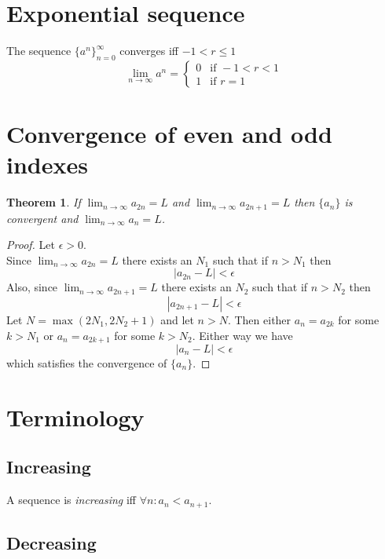 \documentclass{article}
\begin{document}
\section{Exponential sequence} %

The sequence \({\{a^n\}}_{n=0}^\infty\) converges iff \(-1<r\leq 1\)
\[
    \lim_{n\to\infty} a^n = \begin{cases}
        0 & \text{if } -1 < r < 1 \\
        1 & \text{if } r=1
    \end{cases}
\]

\pagebreak

\section{Convergence of even and odd indexes}

\newtheorem*{theorem1}{Theorem}

\begin{theorem1}
    If \(\lim_{n\to\infty}a_{2n}=L\) and \(\lim_{n\to\infty}a_{2n+1}=L\)
    then \(\{a_n\}\) is convergent and \(\lim_{n\to\infty}a_n=L\).
\end{theorem1}
\begin{proof}
    Let \(\epsilon>0\). \\
    Since \(\lim_{n\to\infty}a_{2n}=L\) there exists an \(N_1\) such that
    if \(n>N_1\) then
    \[
        |a_{2n}-L|<\epsilon
    \]
    Also, since \(\lim_{n\to\infty}a_{2n+1}=L\) there exists an \(N_2\) such that
    if \(n>N_2\) then
    \[
        |a_{2n+1}-L|<\epsilon
    \]
    Let \(N=\max(2N_1, 2N_2+1)\) and let \(n>N\).
    Then either \(a_n=a_{2k}\) for some \(k>N_1\) or \(a_n=a_{2k+1}\)
    for some \(k>N_2\). Either way we have
    \[
        |a_n-L|<\epsilon
    \]
    which satisfies the convergence of \(\{a_n\}\).
\end{proof}

\section{Terminology}

\subsection{Increasing}

A sequence is \textit{increasing} iff \(\forall n:  a_n<a_{n+1}\).

\subsection{Decreasing}
\end{document}

